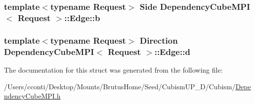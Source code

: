 \subsubsection[{b}]{\setlength{\rightskip}{0pt plus 5cm}template$<$typename Request$>$ Side {\bf Dependency\+Cube\+M\+P\+I}$<$ Request $>$\+::Edge\+::b}\label{struct_dependency_cube_m_p_i_1_1_edge_a017525e4ab3ec35aa19a4de2c7b6ebc1}
\hypertarget{struct_dependency_cube_m_p_i_1_1_edge_a8669784b9f597960def87cc96ebd0e1f}{}
\subsubsection[{d}]{\setlength{\rightskip}{0pt plus 5cm}template$<$typename Request$>$ Direction {\bf Dependency\+Cube\+M\+P\+I}$<$ Request $>$\+::Edge\+::d}\label{struct_dependency_cube_m_p_i_1_1_edge_a8669784b9f597960def87cc96ebd0e1f}


The documentation for this struct was generated from the following file\+:\begin{DoxyCompactItemize}
\item 
/\+Users/cconti/\+Desktop/\+Mounts/\+Brutus\+Home/\+Seed/\+Cubism\+U\+P\+\_\+D/\+Cubism/\hyperlink{_dependency_cube_m_p_i_8h}{Dependency\+Cube\+M\+P\+I.\+h}\end{DoxyCompactItemize}

